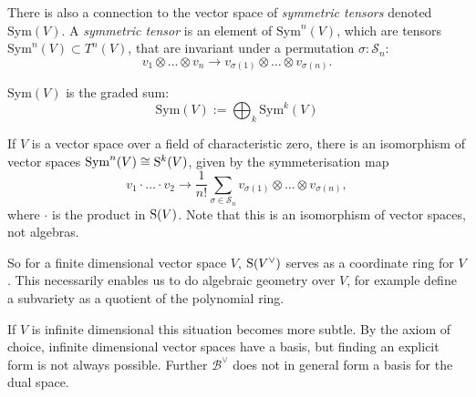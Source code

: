     There is also a connection to the vector space of \emph{symmetric tensors} denoted \( \mathrm{Sym}(V)\). A \emph{symmetric tensor} is an element of \(\mathrm{Sym}^n(V)\), which are tensors \(\mathrm{Sym}^n(V) \subset T^n(V)\), that are invariant under a permutation \( \sigma : \mathcal{S}_n\):
    \[ v_1 \otimes \dots \otimes v_n \rightarrow v_{\sigma(1)} \otimes \dots \otimes v_{\sigma(n)}.\]

    \begin{defn}
    \( \mathrm{Sym}(V)\) is the graded sum: 
    \[ \mathrm{Sym}(V):= \bigoplus_k \mathrm{Sym}^k(V) \]
    \end{defn}
    
    If \(V\) is a vector space over a field of characteristic zero, there is an isomorphism of vector spaces \( \mathrm{Sym}^n(V) \cong \mathrm{S}^k(V) \), given by the symmeterisation map
    \[ v_1 \cdot \dots \cdot v_2 \rightarrow  \frac{1}{n!} \sum_{\sigma \in \mathcal{S}_n} v_{\sigma(1)} \otimes \dots \otimes v_{\sigma(n)}, \]
    where \( \cdot \) is the product in \( \mathrm{S}(V)\). Note that this is an isomorphism of vector spaces, not algebras.
    
    So for a finite dimensional vector space \(V\), \( \mathrm{S}(V^\vee)\) serves as a coordinate ring for \(V\). This necessarily enables us to do algebraic geometry over \(V\), for example define a subvariety as a quotient of the polynomial ring.
    
    If \( V\) is infinite dimensional this situation becomes more subtle. By the axiom of choice, infinite dimensional vector spaces have a basis, but finding an explicit form is not always possible. Further \( \mathcal{B}^\vee\) does not in general form a basis for the dual space.

    
    
    

    
    \newpage
    
    
